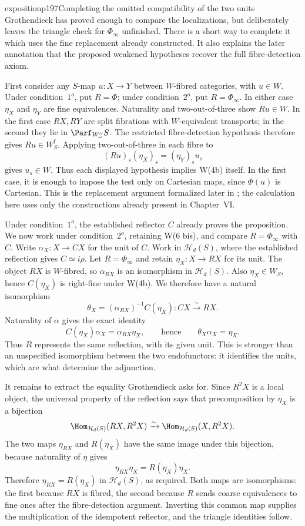 \begin{dcomment}{exposition}{p197}{Completing the omitted compatibility of the two units}
Grothendieck has proved enough to compare the localizations, but deliberately leaves the triangle check for $\Phi_\infty$ unfinished. There is a short way to complete it which uses the fine replacement already constructed. It also explains the later annotation that the proposed weakened hypotheses recover the full fibre-detection axiom.

First consider any $S$-map $u:X\to Y$ between $W$-fibred categories, with $u\in W$. Under condition~$1^o$, put $R=\Phi$; under condition~$2^o$, put $R=\Phi_\infty$. In either case $\eta_X$ and $\eta_Y$ are fine equivalences. Naturality and two-out-of-three show $Ru\in W$. In the first case $RX,RY$ are split fibrations with $W$-equivalent transports; in the second they lie in $\Parf_{W''_\omega}S$. The restricted fibre-detection hypothesis therefore gives $Ru\in W_S^{\mathrm f}$. Applying two-out-of-three in each fibre to
\[
 (Ru)_s(\eta_X)_s=(\eta_Y)_s u_s
\]
gives $u_s\in W$. Thus each displayed hypothesis implies W(4b) itself. In the first case, it is enough to impose the test only on Cartesian maps, since $\Phi(u)$ is Cartesian. This is the replacement argument formalized later in \citet[Lemma~4.4.9 and Corollary~4.4.10]{Grothendieck1991XVI}; the calculation here uses only the constructions already present in Chapter~VI.

Under condition~$1^o$, the established reflector $C$ already proves the proposition. We now work under condition~$2^o$, retaining W(6 bis), and compare $R=\Phi_\infty$ with $C$. Write $\alpha_X:X\to CX$ for the unit of $C$. Work in $\mathcal H_d(S)$, where the established reflection gives $C\simeq i\rho$. Let $R=\Phi_\infty$ and retain $\eta_X:X\to RX$ for its unit. The object $RX$ is $W$-fibred, so $\alpha_{RX}$ is an isomorphism in $\mathcal H_d(S)$. Also $\eta_X\in W_S$, hence $C(\eta_X)$ is right-fine under W(4b). We therefore have a natural isomorphism
\[
 \theta_X=(\alpha_{RX})^{-1}C(\eta_X):CX\xrightarrow{\sim}RX.
\]
Naturality of $\alpha$ gives the exact identity
\[
 C(\eta_X)\alpha_X=\alpha_{RX}\eta_X,
 \qquad\text{hence}\qquad \theta_X\alpha_X=\eta_X.
\]
Thus $R$ represents the same reflection, with its given unit. This is stronger than an unspecified isomorphism between the two endofunctors: it identifies the units, which are what determine the adjunction.

It remains to extract the equality Grothendieck asks for. Since $R^2X$ is a local object, the universal property of the reflection says that precomposition by $\eta_X$ is a bijection
\[
 \Hom_{\mathcal H_d(S)}(RX,R^2X)
       \xrightarrow{\sim}
 \Hom_{\mathcal H_d(S)}(X,R^2X).
\]
The two maps $\eta_{RX}$ and $R(\eta_X)$ have the same image under this bijection, because naturality of $\eta$ gives
\[
 \eta_{RX}\eta_X=R(\eta_X)\eta_X.
\]
Therefore $\eta_{RX}=R(\eta_X)$ in $\mathcal H_d(S)$, as required. Both maps are isomorphisms: the first because $RX$ is fibred, the second because $R$ sends coarse equivalences to fine ones after the fibre-detection argument. Inverting this common map supplies the multiplication of the idempotent reflector, and the triangle identities follow.


\end{dcomment}
